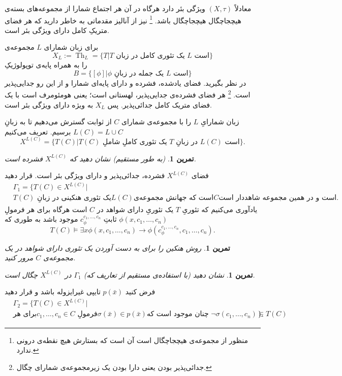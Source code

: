\documentclass[12pt,a4paper]{article}
\theoremstyle{colorhead}
\newtheorem{tam}[thm]{تمرین}
\DeclareMathOperator{\Th}{Th}
\begin{document}
معادلاً 
$(X,\tau)$
ويژگی بئر دارد هرگاه در آن هر اجتماع شمارا از مجموعه‌های بسته‌ی
	هیچجاچگال
هیچجاچگال باشد.
\footnote{منظور از مجموعه‌ی هیچجاچگال است آن است که بستارش هیچ نقطه‌ی درونی ندارد.}
نیز 
از آنالیز مقدماتی به خاطر دارید که هر فضای متریکِ کامل دارای ویژگی
بئر است. 
\par 
برای زبان شمارای 
$L$
مجموعه‌ی
\[
X_L:=\Th_L=\{T|\text{$T$ یک تئوری کامل در زبان $L$ است}\}
\]
را
به همراه پایه‌ی توپولوژیکِ
\[
B=\{[\phi]|\text{$\phi$ یک جمله در زبانِ $L$ است}\}
\]
در نظر بگیرید. فضای یادشده، فشرده و دارای پایه‌ای شمارا و از این رو جدایی‌پذیر
است. 
\footnote{جدائی‌پذیر بودن یعنی دارا بودن یک زیرمجموعه‌ی شمارای چگال.}
هر فضای فشرده‌ی جدایی‌پذیر، لهستانی
است؛ یعنی هومئومرف است با یک فضای متریک کامل جدائی‌پذیر. پس 
$X_L$
به ویژه دارای ویژگی بئر است. 
\par 
زبان شمارایِ
$L$
را با مجموعه‌ی شمارای
$C$
از ثوابت گسترش می‌دهیم تا به زبانِ
\mbox{$L(C)=L\cup C$}
برسیم.  تعریف می‌کنیم
\[ X^{L(C)}=\{T(C)|\text{$T(C)$ یک تئوری کاملِ  شاملِ $T$ در زبانِ $L(C)$ است}\}.\]
\begin{tam}
(به طور مستقیم)
نشان دهید که
$X^{L(C)}$
فشرده است.
\end{tam}
فضای
$X^{L(C)}$
فشرده، جدائی‌پذیر  و دارای ویژگی بئر است. قرار دهید
\begin{align*}
& \Gamma_1=\{T(C)\in X^{L(C)}|
\\
&
\text{$T(C)$ یک تئوری هنکینی در زبانِ
$L(C)$
است که جهانش مجموعه‌ی
$C$
است و در همین مجموعه‌ 
شاهددار است.
}
\end{align*}
یادآوری می‌کنیم که تئوریِ
$T$
یک تئوریِ دارای شواهد در
$C$
است هرگاه برای هر فرمولِ
$\phi(x,c_1,\ldots,c_n)$
ثابتِ
$c_\phi^{c_1,\ldots,c_n}$
موجود باشد به طوری که 
\[
T(C)\models \exists x\phi(x,c_1,\ldots,c_n)\to \phi(c_\phi^{c_1,\ldots,c_n},c_1,\ldots,c_n).
\]
\begin{tam}
روش هنکین را برای به دست آوردن یک تئوری دارای شواهد در یک مجموعه‌ی
$C$
مرور کنید.
\end{tam}
\begin{tam}
نشان دهید (با استفاده‌ی مستقیم از تعاریف که)
$\Gamma_1$
در
$X^{L(C)}$
چگال است.
\end{tam}
فرض کنید
$p(\bar{x})$
تایپی غیرایزوله باشد و قرار دهید
\begin{align*}
& \Gamma_2=\{T(C)\in X^{L(C)}|
\\
&  \text{برای هر
$c_1,\ldots,c_n\in C$ فرمولِ
$\sigma(\bar{x})\in p(\bar{x})$
چنان موجود است که 
$\neg \sigma(c_1,\ldots,c_n)\in T(C)$
}\}.
\end{align*}
\end{document}
